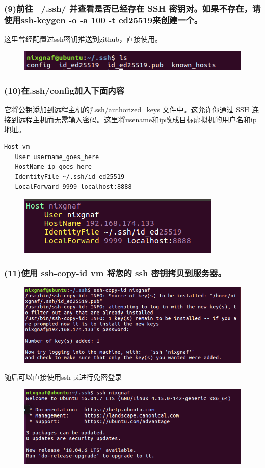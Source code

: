 \documentclass{article}
\begin{document}
\subsubsection{(9)前往 ~/.ssh/ 并查看是否已经存在 SSH 密钥对。如果不存在，请使用ssh-keygen -o -a 100 -t ed25519来创建一个。}
\noindent 这里曾经配置过ssh密钥推送到github，直接使用。
\begin{figure}[h]
    \centering
    \includegraphics[width=0.7\linewidth]{image9.png}
\end{figure}

\subsubsection{(10)在.ssh/config加入下面内容}
\noindent 它将公钥添加到远程主机的\~/.ssh/authorized\_keys 文件中。这允许你通过 SSH 连接到远程主机而无需输入密码。这里将usename和ip改成目标虚拟机的用户名和ip地址。
\begin{lstlisting}[style=myStyle]
Host vm
   User username_goes_here
   HostName ip_goes_here
   IdentityFile ~/.ssh/id_ed25519
   LocalForward 9999 localhost:8888
\end{lstlisting}
\begin{figure}[h]
    \centering
    \includegraphics[width=0.5\linewidth]{image10.png}
\end{figure}

\subsubsection{(11)使用 ssh-copy-id vm 将您的 ssh 密钥拷贝到服务器。}

\begin{figure}[h]
    \centering
    \includegraphics[width=0.75\linewidth]{image11.png}
\end{figure}
\noindent 随后可以直接使用ssh pi进行免密登录
\begin{figure}[h]
    \centering
    \includegraphics[width=0.75\linewidth]{image12.png}
\end{figure}
\end{document}
